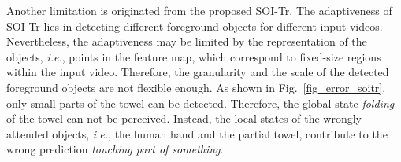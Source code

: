 Another limitation is originated from the proposed SOI-Tr.
The adaptiveness of SOI-Tr lies in detecting different foreground objects for different input videos.
Nevertheless, the adaptiveness may be limited by the representation of the objects, \textit{i.e.}, points in the feature map, which correspond to fixed-size regions within the input video. Therefore, the granularity and the scale of the detected foreground objects are not flexible enough.
As shown in Fig.~\ref{fig_error_soitr}, only small parts of the towel can be detected.
Therefore, the global state \textit{folding} of the towel can not be perceived. Instead, the local states of the wrongly attended objects, \textit{i.e.}, the human hand and the partial towel, contribute to the wrong prediction \textit{touching part of something}.














